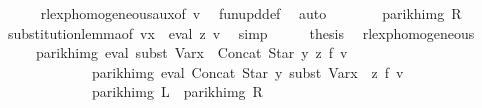 \begin{isabellebody}
\ \ \ \ \isamarkupfalse%
\ rlexp{\isacharunderscore}{\kern0pt}homogeneous{\isacharunderscore}{\kern0pt}aux{\isacharbrackleft}{\kern0pt}of\ {\isacharquery}{\kern0pt}v{\isacharprime}{\kern0pt}{\isacharbrackright}{\kern0pt}\ \isamarkupfalse%
\ fun{\isacharunderscore}{\kern0pt}upd{\isacharunderscore}{\kern0pt}def\ \isamarkupfalse%
\ auto\isanewline
\ \ \isamarkupfalse%
\ \isamarkupfalse%
\ {\isachardoublequoteopen}{\isasymdots}\ {\isacharequal}{\kern0pt}\ parikh{\isacharunderscore}{\kern0pt}img\ {\isacharquery}{\kern0pt}R{\isachardoublequoteclose}\ \isamarkupfalse%
\ substitution{\isacharunderscore}{\kern0pt}lemma{\isacharbrackleft}{\kern0pt}of\ {\isachardoublequoteopen}v{\isacharparenleft}{\kern0pt}x\ {\isacharcolon}{\kern0pt}{\isacharequal}{\kern0pt}\ eval\ z\ v{\isacharparenright}{\kern0pt}{\isachardoublequoteclose}{\isacharbrackright}{\kern0pt}\ \isamarkupfalse%
\ simp\isanewline
\ \ \isamarkupfalse%
\ \isamarkupfalse%
\ {\isacharquery}{\kern0pt}thesis\ \isakeywordONE{{\isachardot}{\kern0pt}}\isamarkupfalse%
\isanewline
{}\isamarkupfalse%
%
\endisatagproof
{\isafoldproof}%
%
\isadelimproof
\isanewline
%
\endisadelimproof
\isanewline
\isanewline
{}\isamarkupfalse%
\ rlexp{\isacharunderscore}{\kern0pt}homogeneous{}{\isacharcolon}{\kern0pt}\isanewline
\ \ \ \ \ {\isachardoublequoteopen}parikh{\isacharunderscore}{\kern0pt}img\ {\isacharparenleft}{\kern0pt}eval\ {\isacharparenleft}{\kern0pt}subst\ {\isacharparenleft}{\kern0pt}Var{\isacharparenleft}{\kern0pt}x\ {\isacharcolon}{\kern0pt}{\isacharequal}{\kern0pt}\ Concat\ {\isacharparenleft}{\kern0pt}Star\ y{\isacharparenright}{\kern0pt}\ z{\isacharparenright}{\kern0pt}{\isacharparenright}{\kern0pt}\ f{\isacharparenright}{\kern0pt}\ v{\isacharparenright}{\kern0pt}\isanewline
\ \ \ \ \ \ \ \ \ \ \ \ {\isasymsubseteq}\ parikh{\isacharunderscore}{\kern0pt}img\ {\isacharparenleft}{\kern0pt}eval\ {\isacharparenleft}{\kern0pt}Concat\ {\isacharparenleft}{\kern0pt}Star\ y{\isacharparenright}{\kern0pt}\ {\isacharparenleft}{\kern0pt}subst\ {\isacharparenleft}{\kern0pt}Var{\isacharparenleft}{\kern0pt}x\ {\isacharcolon}{\kern0pt}{\isacharequal}{\kern0pt}\ z{\isacharparenright}{\kern0pt}{\isacharparenright}{\kern0pt}\ f{\isacharparenright}{\kern0pt}{\isacharparenright}{\kern0pt}\ v{\isacharparenright}{\kern0pt}{\isachardoublequoteclose}\isanewline
\ \ \ \ \ \ \ \ \ \ \ \ {\isacharparenleft}{\kern0pt}\ {\isachardoublequoteopen}parikh{\isacharunderscore}{\kern0pt}img\ {\isacharquery}{\kern0pt}L\ {\isasymsubseteq}\ parikh{\isacharunderscore}{\kern0pt}img\ {\isacharquery}{\kern0pt}R{\isachardoublequoteclose}{\isacharparenright}{\kern0pt}\isanewline

\end{isabellebody}
